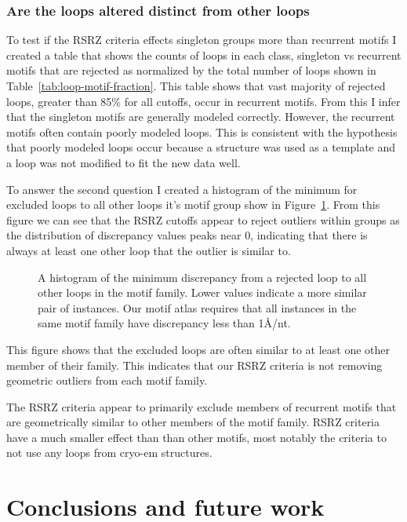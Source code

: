 \subsubsection{Are the loops altered distinct from other loops}

To test if the RSRZ criteria effects singleton groups more than recurrent motifs
I created a table that shows the counts of loops in each class, singleton vs
recurrent motifs that are rejected as normalized by the total number of loops
shown in Table~\ref{tab:loop-motif-fraction}. This table shows that vast
majority of rejected loops, greater than 85\% for all cutoffs, occur in
recurrent motifs. From this I infer that the singleton motifs are generally
modeled correctly. However, the recurrent motifs  often contain poorly  modeled
loops. This is consistent with the hypothesis that poorly modeled loops occur
because a structure was used as a template and a loop was not modified to fit
the new data well.

To answer the second question I created a histogram of the minimum for excluded
loops to all other loops it's motif group show in
Figure~\ref{fig:exclude-min-disc}. From this figure we can see that the RSRZ
cutoffs appear to reject outliers within groups as the distribution of
discrepancy values peaks near 0, indicating that there is always at least one
other loop that the outlier is similar to.

\begin{figure}
  \caption{A histogram of the minimum discrepancy from a rejected loop to all
    other loops in the motif family. Lower values indicate a more similar pair
    of instances. Our motif atlas requires that all instances in the same motif
  family have discrepancy less than 1{\AA}/nt.}
  \label{fig:exclude-min-disc}
\end{figure}

This figure shows that the excluded loops are often similar to at least one
other member of their family. This indicates that our RSRZ criteria is not
removing geometric outliers from each motif family.

The RSRZ criteria appear to primarily exclude members of recurrent motifs that
are geometrically similar to other members of the motif family. RSRZ criteria
have a much smaller effect than than other motifs, most notably the criteria to
not use any loops from cryo-em structures.

\section{Conclusions and future work}

